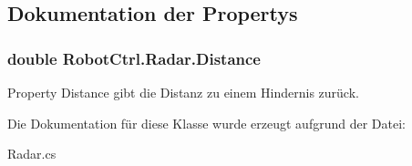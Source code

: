 \subsection{Dokumentation der Propertys}
\hypertarget{class_robot_ctrl_1_1_radar_a0339d462806cb7fc3759d850b5564dd9}{
\subsubsection[{Distance}]{\setlength{\rightskip}{0pt plus 5cm}double RobotCtrl.Radar.Distance}}
\label{class_robot_ctrl_1_1_radar_a0339d462806cb7fc3759d850b5564dd9}
Property Distance gibt die Distanz zu einem Hindernis zur\"{u}ck. 

Die Dokumentation für diese Klasse wurde erzeugt aufgrund der Datei:\begin{DoxyCompactItemize}
\item 
Radar.cs\end{DoxyCompactItemize}
